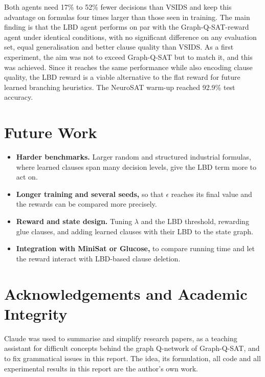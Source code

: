 \documentclass[11pt,a4paper]{article}
\begin{document}
Both agents need 17\% to 52\% fewer decisions than VSIDS and keep this advantage on formulas four times larger than those seen in training. The main finding is that the LBD agent performs on par with the Graph-Q-SAT-reward agent under identical conditions, with no significant difference on any evaluation set, equal generalisation and better clause quality than VSIDS. As a first experiment, the aim was not to exceed Graph-Q-SAT but to match it, and this was achieved. Since it reaches the same performance while also encoding clause quality, the LBD reward is a viable alternative to the flat reward for future learned branching heuristics. The NeuroSAT warm-up reached 92.9\% test accuracy.

\section*{Future Work}

\begin{itemize}
    \item \textbf{Harder benchmarks.} Larger random and structured industrial formulas, where learned clauses span many decision levels, give the LBD term more to act on.
    \item \textbf{Longer training and several seeds,} so that $\epsilon$ reaches its final value and the rewards can be compared more precisely.
    \item \textbf{Reward and state design.} Tuning $\lambda$ and the LBD threshold, rewarding glue clauses, and adding learned clauses with their LBD to the state graph.
    \item \textbf{Integration with MiniSat or Glucose,} to compare running time and let the reward interact with LBD-based clause deletion.
\end{itemize}

\section*{Acknowledgements and Academic Integrity}

Claude was used to summarise and simplify research papers, as a teaching assistant for difficult concepts behind the graph Q-network of Graph-Q-SAT, and to fix grammatical issues in this report. The idea, its formulation, all code and all experimental results in this report are the author's own work.



\end{document}
